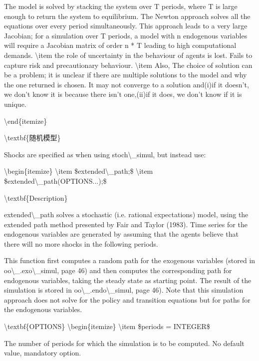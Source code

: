 \documentclass[10pt,math=newtx,citestyle=gb7714-2015,bibstyle=gb7714-2015]{elegantbook}
\begin{document}
	The model is solved by stacking the system over T periods, where T is large enough to return the system to equilibrium. The Newton approach solves all the equations over every period simultaneously. This approach leads to a very large Jacobian; for a simulation over T periods, a model with n endogenous variables will require a Jacobian matrix of order n * T leading to high computational demands.
	\textbackslash{}item the role of uncertainty in the behaviour of agents is lost. Fails to capture risk and precautionary behaviour.
	\textbackslash{}item Also, The choice of solution can be a problem; it is unclear if there are multiple solutions to the model and why the one returned is chosen. It may not converge to a solution and(i)if it doesn't, we don't know it is because there isn't one,(ii)if it does, we don't know if it is unique.
	
	\textbackslash{}end\{itemize\}
	
	
	\textbackslash{}textbf\{随机模型\}
	
	Shocks are specified as when using stoch\textbackslash{}\_simul, but instead use:
	
	\textbackslash{}begin\{itemize\}
	\textbackslash{}item \$extended\textbackslash{}\_path;\$
	\textbackslash{}item \$extended\textbackslash{}\_path(OPTIONS...);\$
	
	\textbackslash{}textbf\{Description\}
	
	extended\textbackslash{}\_path solves a stochastic (i.e. rational expectations) model, using the extended path method presented by Fair and Taylor (1983). Time series for the endogenous variables are generated by assuming that the agents believe that there will no more shocks in the following periods.
	
	This function first computes a random path for the exogenous variables (stored in oo\textbackslash{}\_.exo\textbackslash{}\_simul, page 46) and then computes the corresponding path for endogenous variables, taking the steady state as starting point. The result of the simulation is stored in oo\textbackslash{}\_.endo\textbackslash{}\_simul, page 46). Note that this simulation approach does not solve for the policy and transition equations but for paths for the endogenous variables.
	
	\textbackslash{}textbf\{OPTIONS\}
	\textbackslash{}begin\{itemize\}
	\textbackslash{}item \$periods = INTEGER\$
	
	The number of periods for which the simulation is to be computed. No default value, mandatory option.
	
\end{document}
